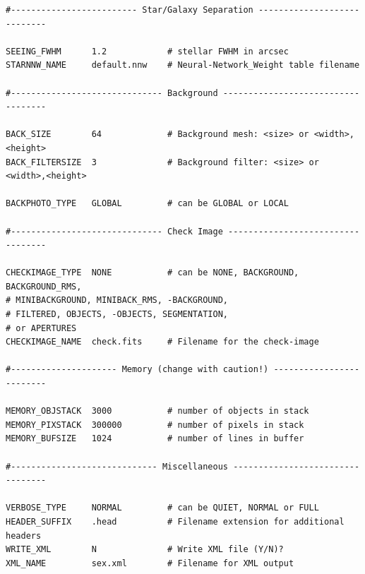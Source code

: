 \documentclass{aastex61}
\begin{document}
\begin{lstlisting}[caption = Configuration file for Source Extractor (YM)]
#------------------------- Star/Galaxy Separation ----------------------------

SEEING_FWHM      1.2            # stellar FWHM in arcsec
STARNNW_NAME     default.nnw    # Neural-Network_Weight table filename

#------------------------------ Background -----------------------------------

BACK_SIZE        64             # Background mesh: <size> or <width>,<height>
BACK_FILTERSIZE  3              # Background filter: <size> or <width>,<height>

BACKPHOTO_TYPE   GLOBAL         # can be GLOBAL or LOCAL

#------------------------------ Check Image ----------------------------------

CHECKIMAGE_TYPE  NONE           # can be NONE, BACKGROUND, BACKGROUND_RMS,
# MINIBACKGROUND, MINIBACK_RMS, -BACKGROUND,
# FILTERED, OBJECTS, -OBJECTS, SEGMENTATION,
# or APERTURES
CHECKIMAGE_NAME  check.fits     # Filename for the check-image

#--------------------- Memory (change with caution!) -------------------------

MEMORY_OBJSTACK  3000           # number of objects in stack
MEMORY_PIXSTACK  300000         # number of pixels in stack
MEMORY_BUFSIZE   1024           # number of lines in buffer

#----------------------------- Miscellaneous ---------------------------------

VERBOSE_TYPE     NORMAL         # can be QUIET, NORMAL or FULL
HEADER_SUFFIX    .head          # Filename extension for additional headers
WRITE_XML        N              # Write XML file (Y/N)?
XML_NAME         sex.xml        # Filename for XML output                                      
\end{lstlisting}
\end{document}
